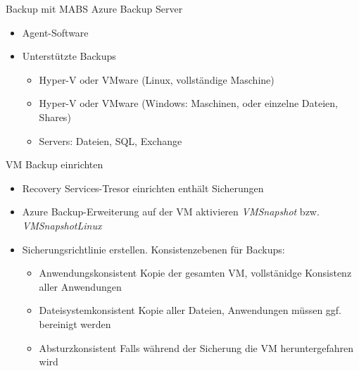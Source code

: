 \begin{flashcard}[Definition]{Backup mit MABS}
    Azure Backup Server
    \begin{itemize}
        \item Agent-Software
        \item Unterstützte Backups
            \begin{itemize}
                \item Hyper-V oder VMware (Linux, vollständige Maschine)
                \item Hyper-V oder VMware (Windows: Maschinen, oder einzelne Dateien, Shares)
                \item Servers: Dateien, SQL, Exchange
            \end{itemize}
    \end{itemize}
\end{flashcard}


\begin{flashcard}[Definition]{VM Backup einrichten}
    \begin{itemize}
        \item Recovery Services-Tresor einrichten\newline
            enthält Sicherungen
        \item Azure Backup-Erweiterung auf der VM aktivieren\newline
            \emph{VMSnapshot} bzw. \emph{VMSnapshotLinux}
        \item Sicherungsrichtlinie erstellen. Konsistenzebenen für Backups:
            \begin{itemize}
             \item Anwendungskonsistent\newline
                Kopie der gesamten VM, vollstänidge Konsistenz aller Anwendungen
             \item Dateisystemkonsistent\newline
                Kopie aller Dateien, Anwendungen müssen ggf. bereinigt werden
             \item Absturzkonsistent\newline
                Falls während der Sicherung die VM heruntergefahren wird
            \end{itemize}

    \end{itemize}
\end{flashcard}

